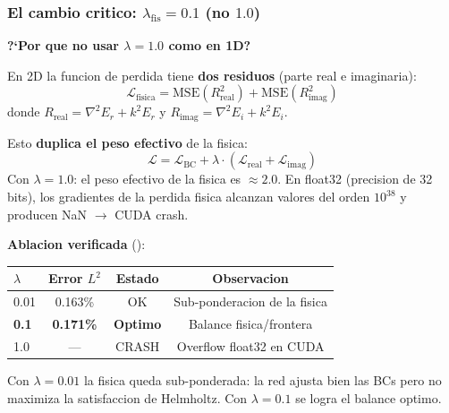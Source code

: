\vspace{6pt}

\subsubsection*{El cambio critico: $\lambda_\text{fis} = 0.1$ (no $1.0$)}

\begin{tcolorbox}[colback=slidewarning!60, colframe=ujatorange,
  title={\bfseries Explicacion de la calibracion de $\lambda$}, coltitle=white, breakable]
\textbf{?`Por que no usar $\lambda = 1.0$ como en 1D?}

En 2D la funcion de perdida tiene \textbf{dos residuos} (parte real e imaginaria):
\[
  \mathcal{L}_\text{fisica} = \text{MSE}(R_\text{real}^2) + \text{MSE}(R_\text{imag}^2)
\]
donde $R_\text{real} = \nabla^2 E_r + k^2 E_r$ y $R_\text{imag} = \nabla^2 E_i + k^2 E_i$.

Esto \textbf{duplica el peso efectivo} de la fisica:
\[
  \mathcal{L} = \mathcal{L}_\text{BC} + \lambda \cdot (\mathcal{L}_\text{real} + \mathcal{L}_\text{imag})
\]
Con $\lambda = 1.0$: el peso efectivo de la fisica es $\approx 2.0$. En float32 (precision
de 32 bits), los gradientes de la perdida fisica alcanzan valores del orden $10^{38}$
y producen NaN $\to$ CUDA crash.

\textbf{Ablacion verificada} ():
\begin{center}
\begin{tabular}{@{}lccc@{}}
\toprule
$\lambda$ & Error $L^2$ & Estado & Observacion \\
\midrule
0.01 & 0.163\% & OK & Sub-ponderacion de la fisica \\
\textbf{0.1} & \textbf{0.171\%} & \textbf{Optimo} & Balance fisica/frontera \\
1.0 & --- & CRASH & Overflow float32 en CUDA \\
\bottomrule
\end{tabular}
\end{center}

Con $\lambda = 0.01$ la fisica queda sub-ponderada: la red ajusta bien las BCs
pero no maximiza la satisfaccion de Helmholtz. Con $\lambda = 0.1$ se logra el
balance optimo.
\end{tcolorbox}

